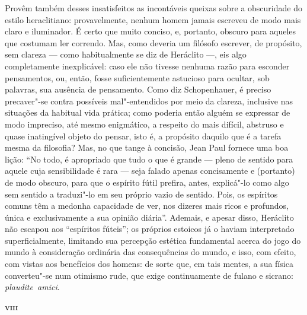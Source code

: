 Provêm também desses insatisfeitos as incontáveis queixas sobre a obscuridade
do estilo heraclitiano: provavelmente, nenhum homem jamais escreveu de modo
mais claro e iluminador. É certo que muito conciso, e, portanto, obscuro para
aqueles que costumam ler correndo. Mas, como deveria um filósofo escrever, de
propósito, sem clareza --- como habitualmente se diz de Heráclito ---, eis algo
completamente inexplicável: caso ele não tivesse nenhuma razão para esconder
pensamentos, ou, então, fosse suficientemente astucioso para ocultar, sob
palavras, sua ausência de pensamento. Como diz Schopenhauer, é preciso
precaver"-se contra possíveis mal"-entendidos por meio da clareza, inclusive
nas situações da habitual vida prática; como poderia então alguém se
expressar de modo impreciso, até mesmo enigmático, a respeito do mais
difícil, abstruso e quase inatingível objeto do pensar, isto é, a propósito
daquilo que é a tarefa mesma da filosofia? Mas, no que tange à concisão, Jean
Paul fornece uma boa lição: ``No todo, é apropriado que tudo o que é
grande --- pleno de sentido para aquele cuja sensibilidade é rara --- seja
falado apenas concisamente e (portanto) de modo obscuro, para que o espírito
fútil prefira, antes, explicá"-lo como algo sem sentido a traduzi"-lo em seu
próprio vazio de sentido. Pois, os espíritos comuns têm a medonha capacidade
de ver, nos dizeres mais ricos e profundos, única e exclusivamente a sua
opinião diária''. Ademais, e apesar disso, Heráclito não escapou aos
``espíritos fúteis''; os próprios estoicos já o haviam interpretado
superficialmente, limitando sua percepção estética fundamental acerca do jogo
do mundo à consideração ordinária das consequências do mundo, e isso, com
efeito, com vistas aos benefícios dos homens: de sorte que, em tais mentes, a
sua física converteu"-se num otimismo rude, que exige continuamente de fulano
e sicrano: \mbox{\textit{plaudite amici}.} 

\bigskip
\textsc{\textbf{viii}}
\bigskip

